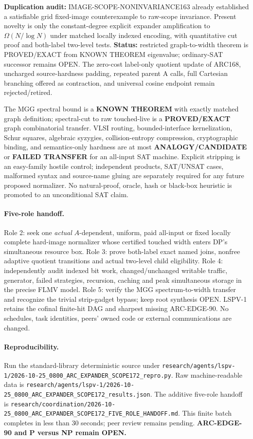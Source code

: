 \documentclass[11pt]{article}
\begin{document}
\textbf{Duplication audit:} IMAGE-SCOPE-NONINVARIANCE163 already established a satisfiable grid fixed-image counterexample to raw-scope invariance. Present novelty is only the constant-degree explicit expander amplification to $\Omega(N/\log N)$ under matched locally indexed encoding, with quantitative cut proof and both-label two-level tests. \textbf{Status:} restricted graph-to-width theorem is PROVED/EXACT from KNOWN THEOREM eigenvalue; ordinary-SAT successor remains OPEN. The zero-cost label-only quotient update of ARC168, uncharged source-hardness padding, repeated parent A calls, full Cartesian branching offered as contraction, and universal cosine endpoint remain rejected/retired.

The MGG spectral bound is a \textbf{KNOWN THEOREM} with exactly matched graph definition; spectral-cut to raw touched-live is a \textbf{PROVED/EXACT} graph combinatorial transfer. VLSI routing, bounded-interface kernelization, Schur squares, algebraic syzygies, collision-entropy compression, cryptographic binding, and semantics-only hardness are at most \textbf{ANALOGY/CANDIDATE} or \textbf{FAILED TRANSFER} for an all-input SAT machine. Explicit stripping is an easy-family hostile control; independent products, SAT/UNSAT cases, malformed syntax and source-name gluing are separately required for any future proposed normalizer. No natural-proof, oracle, hash or black-box heuristic is promoted to an unconditional SAT claim.

\paragraph{Five-role handoff.}
Role 2: seek one \emph{actual} $A$-dependent, uniform, paid all-input or fixed locally complete hard-image normalizer whose certified touched width enters DP's simultaneous resource box. Role 3: prove both-label exact named joins, nonfree adaptive quotient transitions and actual two-level child eligibility. Role 4: independently audit indexed bit work, changed/unchanged writable traffic, generator, failed strategies, recursion, caching and peak simultaneous storage in the precise FLMV model. Role 5: verify the MGG spectrum-to-width transfer and recognize the trivial strip-gadget bypass; keep root synthesis OPEN. LSPV-1 retains the cofinal finite-hit DAG and sharpest missing ARC-EDGE-90. No schedules, task identities, peers' owned code or external communications are changed.

\paragraph{Reproducibility.}
Run the standard-library deterministic source under \texttt{research/agents/lspv-1/2026-10-25\_0800\_ARC\_EXPANDER\_SCOPE172\_repro.py}. Raw machine-readable data is \texttt{research/agents/lspv-1/2026-10-25\_0800\_ARC\_EXPANDER\_SCOPE172\_results.json}. The additive five-role handoff is \texttt{research/coordination/2026-10-25\_0800\_ARC\_EXPANDER\_SCOPE172\_FIVE\_ROLE\_HANDOFF.md}. This finite batch completes in less than 30 seconds; peer review remains pending. \textbf{ARC-EDGE-90 and P versus NP remain OPEN.}
\end{document}
